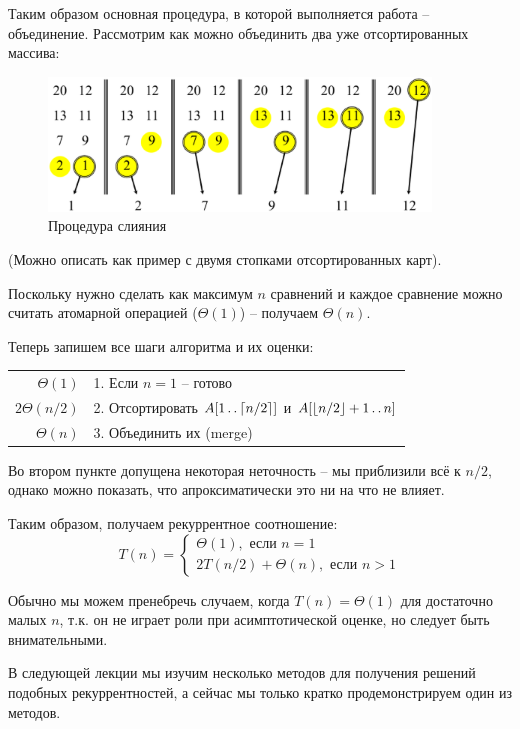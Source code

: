 \documentclass[11pt]{article}
\begin{document}
Таким образом основная процедура, в которой выполняется работа -- объединение.
Рассмотрим как можно объединить два уже отсортированных массива:

\begin{figure}[ht]
  \centering
  \includegraphics[width=4in]{lecture1/merge.eps}
  \caption{Процедура слияния}
  \label{fig:merge}
\end{figure}

(Можно описать как пример с двумя стопками отсортированных карт).

Поскольку нужно сделать как максимум $n$ сравнений и каждое сравнение можно
считать атомарной операцией ($\Theta(1)$) -- получаем $\Theta(n)$.

Теперь запишем все шаги алгоритма и их оценки:

\begin{tabular}{|r|l|}
$\Theta(1)$    & 1. Если $n = 1$ -- готово  \\
$2\Theta(n/2)$ & 2. Отсортировать $A[1 \mathinner{\ldotp\ldotp} \lceil n/2 \rceil]$ и $A[\lfloor
                    n/2 \rfloor+1 \mathinner{\ldotp\ldotp} n]$ \\
$\Theta(n)$    & 3. Объединить их (merge) 
\end{tabular}

Во втором пункте допущена некоторая неточность -- мы приблизили всё к $n/2$,
однако можно показать, что апроксиматически это ни на что не влияет.

Таким образом, получаем рекуррентное соотношение:
\begin{equation}
  T(n) = \begin{cases}
    \Theta(1), \text{ если } n = 1 \\
    2T(n/2) + \Theta(n), \text{ если } n > 1
    \end{cases}
  \label{eq:recur}
\end{equation}

Обычно мы можем пренебречь случаем, когда $T(n) = \Theta(1)$ для достаточно
малых $n$, т.к. он не играет роли при асимптотической оценке, но следует быть
внимательными.

В следующей лекции мы изучим несколько методов для получения решений подобных
рекуррентностей, а сейчас мы только кратко продемонстрируем один из методов.
\end{document}
